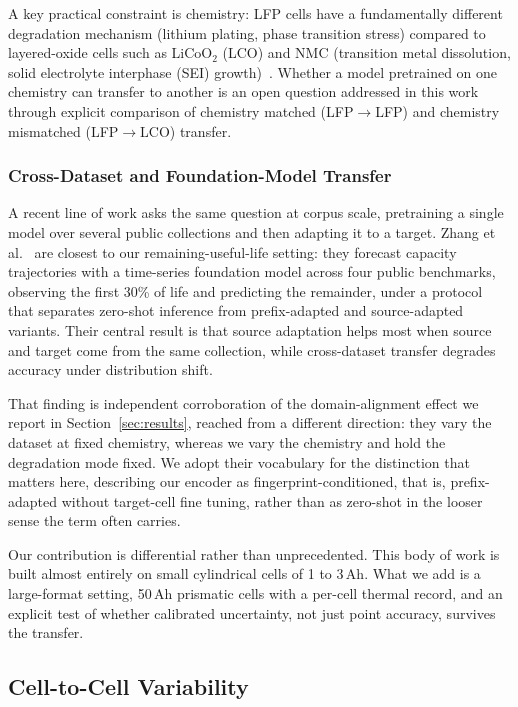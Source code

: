 A key practical constraint is chemistry: LFP cells have a fundamentally
different degradation mechanism (lithium plating, phase transition stress)
compared to layered-oxide cells such as LiCoO$_2$ (LCO) and NMC (transition metal dissolution, solid electrolyte interphase (SEI) growth)~\cite{birkl2017degradation}.
Whether a model pretrained on one chemistry can transfer to another
is an open question addressed in this work through explicit comparison
of chemistry matched (LFP$\rightarrow$LFP) and chemistry mismatched
(LFP$\rightarrow$LCO) transfer.

\subsubsection{Cross-Dataset and Foundation-Model Transfer}

A recent line of work asks the same question at corpus scale, pretraining a
single model over several public collections and then adapting it to a target.
Zhang et al.~\cite{zhang2026crossdataset} are closest to our remaining-useful-life
setting: they forecast capacity trajectories with a time-series foundation model
across four public benchmarks, observing the first 30\% of life and predicting the
remainder, under a protocol that separates zero-shot inference from
prefix-adapted and source-adapted variants. Their central result is that source
adaptation helps most when source and target come from the same collection, while
cross-dataset transfer degrades accuracy under distribution shift.

That finding is independent corroboration of the domain-alignment effect we
report in Section~\ref{sec:results}, reached from a different direction: they vary
the dataset at fixed chemistry, whereas we vary the chemistry and hold the
degradation mode fixed. We adopt their vocabulary for the distinction that matters
here, describing our encoder as fingerprint-conditioned, that is, prefix-adapted
without target-cell fine tuning, rather than as zero-shot in the looser sense the
term often carries.

Our contribution is differential rather than unprecedented. This body of work is
built almost entirely on small cylindrical cells of 1 to 3\,Ah. What we add is a
large-format setting, 50\,Ah prismatic cells with a per-cell thermal record, and
an explicit test of whether calibrated uncertainty, not just point accuracy,
survives the transfer.

\subsection{Cell-to-Cell Variability}

